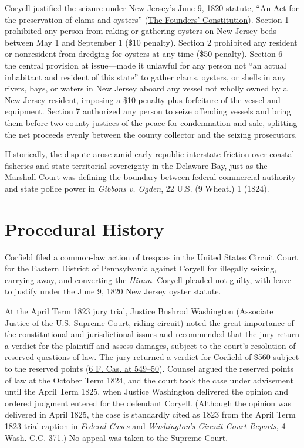 \documentclass[12pt]{article}
\begin{document}
Coryell justified the seizure under New Jersey's June 9, 1820 statute, ``An Act for the preservation of clams and oysters'' (\href{https://press-pubs.uchicago.edu/founders/documents/a4_2_1s18.html}{The Founders' Constitution}). Section 1 prohibited any person from raking or gathering oysters on New Jersey beds between May 1 and September 1 (\$10 penalty). Section 2 prohibited any resident or nonresident from dredging for oysters at any time (\$50 penalty). Section 6---the central provision at issue---made it unlawful for any person not ``an actual inhabitant and resident of this state'' to gather clams, oysters, or shells in any rivers, bays, or waters in New Jersey aboard any vessel not wholly owned by a New Jersey resident, imposing a \$10 penalty plus forfeiture of the vessel and equipment. Section 7 authorized any person to seize offending vessels and bring them before two county justices of the peace for condemnation and sale, splitting the net proceeds evenly between the county collector and the seizing prosecutors.

Historically, the dispute arose amid early-republic interstate friction over coastal fisheries and state territorial sovereignty in the Delaware Bay, just as the Marshall Court was defining the boundary between federal commercial authority and state police power in \textit{Gibbons v. Ogden}, 22 U.S. (9 Wheat.) 1 (1824).

\section{Procedural History}

Corfield filed a common-law action of trespass in the United States Circuit Court for the Eastern District of Pennsylvania against Coryell for illegally seizing, carrying away, and converting the \textit{Hiram}. Coryell pleaded not guilty, with leave to justify under the June 9, 1820 New Jersey oyster statute.

At the April Term 1823 jury trial, Justice Bushrod Washington (Associate Justice of the U.S. Supreme Court, riding circuit) noted the great importance of the constitutional and jurisdictional issues and recommended that the jury return a verdict for the plaintiff and assess damages, subject to the court's resolution of reserved questions of law. The jury returned a verdict for Corfield of \$560 subject to the reserved points (\href{https://opencasebook.org/casebooks/4501-constitutional-law/resources/12.6-corfield-v-coryell/}{6 F. Cas. at 549--50}). Counsel argued the reserved points of law at the October Term 1824, and the court took the case under advisement until the April Term 1825, when Justice Washington delivered the opinion and ordered judgment entered for the defendant Coryell. (Although the opinion was delivered in April 1825, the case is standardly cited as 1823 from the April Term 1823 trial caption in \textit{Federal Cases} and \textit{Washington's Circuit Court Reports}, 4 Wash. C.C. 371.) No appeal was taken to the Supreme Court.
\end{document}
